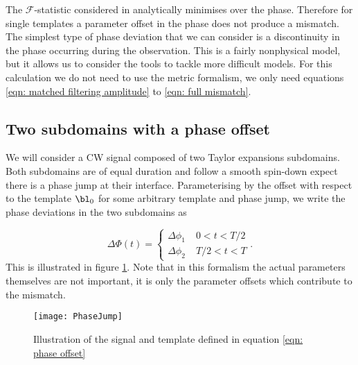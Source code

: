 The $\mathcal{F}$-statistic considered in \citet{Brady1998} analytically 
minimises over the phase. Therefore for single
templates a parameter offset in the phase
does not produce a mismatch. The simplest type of phase deviation that we can
consider is a discontinuity in the phase occurring during the observation. This 
is a fairly nonphysical model, but it allows us to consider the tools to 
tackle more difficult models. For this calculation we do not need to use the
metric formalism, we only need equations \eqref{eqn: matched filtering amplitude}
to \eqref{eqn: full mismatch}.

\subsection{Two subdomains with a phase offset}
\label{sec: Two subdomains with a phase offset}

We will consider a CW signal composed of two Taylor expansions subdomains.  Both
subdomains are of equal duration and follow a smooth spin-down expect there is a
phase jump at their interface. Parameterising by the offset with respect to
the template $\bl_{0}$ for some arbitrary template and phase jump, we write the
phase deviations in the two subdomains as

\begin{equation}
 \Delta\Phi(t) = \left\{
\begin{array}{cr}
\Delta \phi_{1}& \; 0 < t < T/2 \\
\Delta \phi_{2} & \;  T/2 < t < T 
\end{array}.
\right.
\label{eqn: phase offset}
\end{equation}
This is illustrated in figure \ref{fig: PhaseJump}. Note that in this formalism
the actual parameters themselves are not important, it is only the parameter
offsets which contribute to the mismatch.
\begin{figure}[htb]
    \centering
    \texttt{[image: PhaseJump]}
    \caption{Illustration of the signal and template defined in equation 
        \eqref{eqn: phase offset}}
    \label{fig: PhaseJump}
\end{figure}

